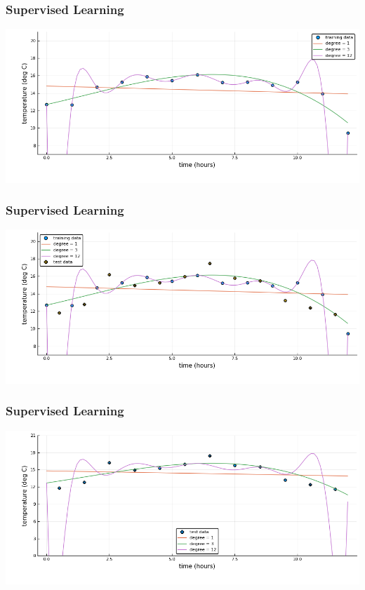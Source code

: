 \documentclass[t]{beamer}
\begin{document}
\begin{frame}
  \frametitle{Supervised Learning}
   \begin{center}
    \includegraphics[scale=0.6]{overfitting4.png}
   \end{center}
\end{frame}

\begin{frame}
  \frametitle{Supervised Learning}
   \begin{center}
    \includegraphics[scale=0.6]{overfitting5.png}
   \end{center}
\end{frame}

\begin{frame}
  \frametitle{Supervised Learning}
   \begin{center}
    \includegraphics[scale=0.6]{overfitting6.png}
   \end{center}
\end{frame}
\end{document}
